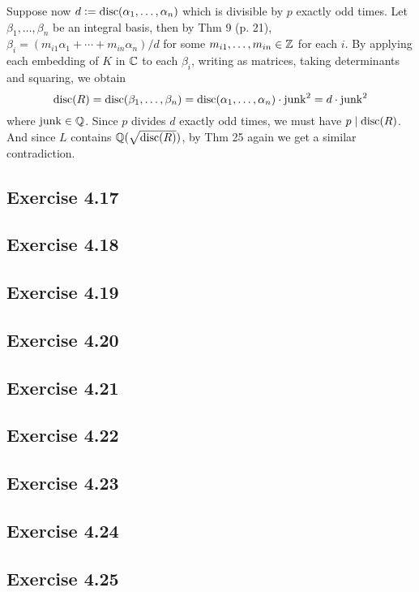 \documentclass[../Marcus.tex]{subfiles}
\begin{document}
Suppose now $d:=\operatorname{disc}(\alpha_1,\ldots,\alpha_n)$ which is divisible by $p$ exactly odd times. Let $\beta_1,\ldots,\beta_n$ be an integral basis, then by Thm 9 (p. 21), $\beta_i=(m_{i1}\alpha_1+\cdots+m_{in}\alpha_n)/d$ for some $m_{i1},\ldots,m_{in}\in\mathbb{Z}$ for each $i$. By applying each embedding of $K$ in $\mathbb{C}$ to each $\beta_i$, writing as matrices, taking determinants and squaring, we obtain $$\operatorname{disc}(R)=\operatorname{disc}(\beta_1,\ldots,\beta_n)=\operatorname{disc}(\alpha_1,\ldots,\alpha_n)\cdot\operatorname{junk}^2=d\cdot\operatorname{junk}^2$$ where $\operatorname{junk}\in\mathbb{Q}$. Since $p$ divides $d$ exactly odd times, we must have $p\mid\operatorname{disc}(R)$. And since $L$ contains $\mathbb{Q}(\sqrt{\operatorname{disc}(R)})$, by Thm 25 again we get a similar contradiction.

\subsection*{Exercise 4.17}

\subsection*{Exercise 4.18}

\subsection*{Exercise 4.19}

\subsection*{Exercise 4.20}

\subsection*{Exercise 4.21}

\subsection*{Exercise 4.22}

\subsection*{Exercise 4.23}

\subsection*{Exercise 4.24}

\subsection*{Exercise 4.25}
\end{document}
